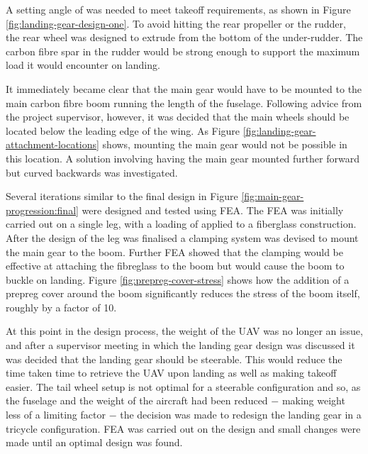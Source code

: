 \documentclass[../../main.tex]{subfiles}
\begin{document}

A setting angle of  was needed to meet takeoff requirements, as shown in Figure \ref{fig:landing-gear-design-one}.
To avoid hitting the rear propeller or the rudder, the rear wheel was designed to extrude from the bottom of the under-rudder.
The carbon fibre spar in the rudder would be strong enough to support the maximum  load it would encounter on landing. 


It immediately became clear that the main gear would have to be mounted to the main carbon fibre boom running the length of the fuselage.
Following advice from the project supervisor, however, it was decided that the main wheels should be located below the leading edge of the wing.
As Figure \ref{fig:landing-gear-attachment-locations} shows, mounting the main gear would not be possible in this location.
A solution involving having the main gear mounted further forward but curved backwards was investigated.  

Several iterations similar to the final design in Figure \ref{fig:main-gear-progression:final} were designed and tested using FEA.
The FEA was initially carried out on a single leg, with a loading of  applied to a fiberglass construction.
After the design of the leg was finalised a clamping system was devised to mount the main gear to the boom.
Further FEA showed that the clamping would be effective at attaching the fibreglass to the boom but would cause the boom to buckle on landing.
Figure \ref{fig:prepreg-cover-stress} shows how the addition of a prepreg cover around the boom significantly reduces the stress of the boom itself, roughly by a factor of 10. 


At this point in the design process, the weight of the UAV was no longer an issue, and after a supervisor meeting in which the landing gear design was discussed it was decided that the landing gear should be steerable.
This would reduce the time taken time to retrieve the UAV upon landing as well as making takeoff easier.
The tail wheel setup is not optimal for a steerable configuration and so, as the fuselage and the weight of the aircraft had been reduced $-$ making weight less of a limiting factor $-$ the decision was made to redesign the landing gear in a tricycle configuration. 
FEA was carried out on the design and small changes were made until an optimal design was found.
\end{document}
